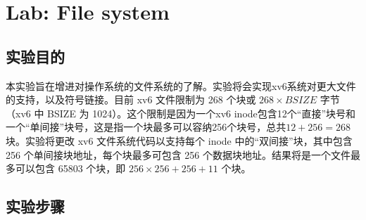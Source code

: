 \section{Lab: File system}
\subsection{实验目的}
本实验旨在增进对操作系统的文件系统的了解。实验将会实现xv6系统对更大文件的支持，以及符号链接。目前 xv6 文件限制为 268 个块或 $268\times BSIZE$ 字节（xv6 中 BSIZE 为 1024）。这个限制是因为一个xv6 inode包含12个“直接”块号和一个“单间接”块号，这是指一个块最多可以容纳256个块号，总共$12+256=268$块。实验将更改 xv6 文件系统代码以支持每个 inode 中的“双间接”块，其中包含 256 个单间接块地址，每个块最多可包含 256 个数据块地址。结果将是一个文件最多可以包含 65803 个块，即 $256\times256+256+11$ 个块。
\subsection{实验步骤}
